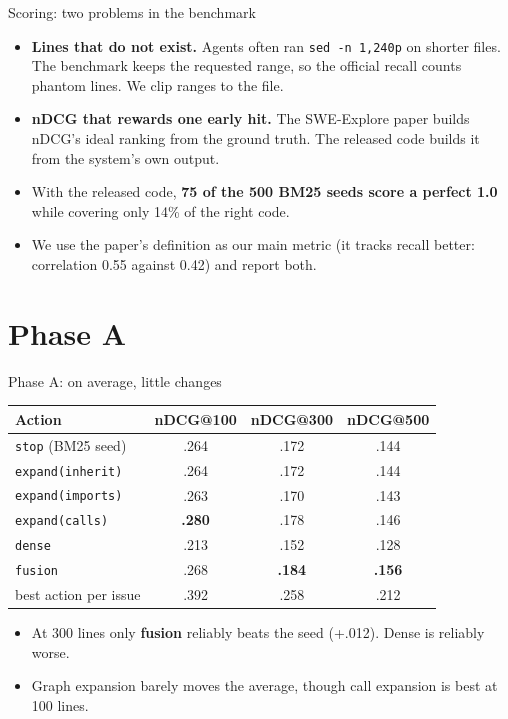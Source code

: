 \documentclass{beamer}
\newcommand{\acn}[1]{\texttt{#1}}
\begin{document}
\begin{frame}{Scoring: two problems in the benchmark}
  \begin{itemize}
    \item \textbf{Lines that do not exist.} Agents often ran \texttt{sed -n 1,240p} on shorter files. The benchmark keeps the requested range, so the official recall counts phantom lines. We clip ranges to the file.
    \item \textbf{nDCG that rewards one early hit.} The SWE-Explore paper builds nDCG's ideal ranking from the ground truth. The released code builds it from the system's own output.
    \item With the released code, \textbf{75 of the 500 BM25 seeds score a perfect 1.0} while covering only 14\% of the right code.
    \item We use the paper's definition as our main metric (it tracks recall better: correlation 0.55 against 0.42) and report both.
  \end{itemize}
\end{frame}

\section{Phase A}

\begin{frame}{Phase A: on average, little changes}
  \centering
  \begin{tabular}{lccc}
    \toprule
    Action & nDCG@100 & nDCG@300 & nDCG@500 \\
    \midrule
    \acn{stop} (BM25 seed) & .264 & .172 & .144 \\
    \acn{expand(inherit)} & .264 & .172 & .144 \\
    \acn{expand(imports)} & .263 & .170 & .143 \\
    \acn{expand(calls)} & \textbf{.280} & .178 & .146 \\
    \acn{dense} & .213 & .152 & .128 \\
    \acn{fusion} & .268 & \textbf{.184} & \textbf{.156} \\
    \midrule
    best action per issue & .392 & .258 & .212 \\
    \bottomrule
  \end{tabular}
  \vspace{2pt}
  \begin{itemize}
    \item At 300 lines only \textbf{fusion} reliably beats the seed (+.012). Dense is reliably worse.
    \item Graph expansion barely moves the average, though call expansion is best at 100 lines.
  \end{itemize}
\end{frame}
\end{document}
